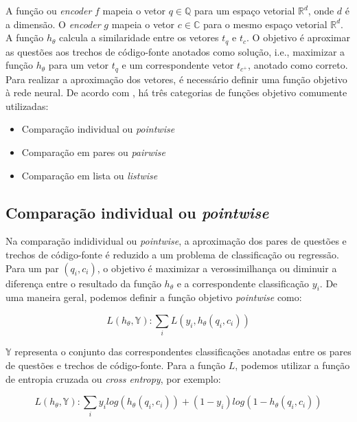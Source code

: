 A função ou \textit{encoder} $f$ mapeia o vetor $q \in \mathbb{Q}$ para um espaço vetorial $\mathbb{R}^{d}$, onde $d$ é a dimensão. O \textit{encoder} $g$ mapeia o vetor $c \in \mathbb{C}$ para o mesmo espaço vetorial $\mathbb{R}^{d}$. A função $h_{\theta}$ calcula a similaridade entre os vetores $t_{q}$ e $t_{c}$. O objetivo é aproximar as questões aos trechos de código-fonte anotados como solução, i.e., maximizar a função $h_{\theta}$ para um vetor $t_{q}$ e um correspondente vetor $t_{c^{+}}$, anotado como correto. Para realizar a aproximação dos vetores, é necessário definir uma função objetivo à rede neural. De acordo com \cite{guo-deep-look-into-neural-ranking-models:2019}, há três categorias de funções objetivo comumente utilizadas:

\begin{itemize}
    \item Comparação individual ou \textit{pointwise}
    \item Comparação em pares ou \textit{pairwise}
    \item Comparação em lista ou \textit{listwise}
\end{itemize}


\subsection{Comparação individual ou \textit{pointwise}}

Na comparação indidividual ou \textit{pointwise}, a aproximação dos pares de questões e trechos de código-fonte é reduzido a um problema de classificação ou regressão. Para um par $(q_{i}, c_{i})$, o objetivo é maximizar a verossimilhança ou diminuir a diferença entre o resultado da função $h_{\theta}$ e a correspondente classificação $y_{i}$. De uma maneira geral, podemos definir a função objetivo \textit{pointwise} como:

\begin{equation}
    L (h_{\theta}, \mathbb{Y}): \sum_{i} L(y_{i}, h_{\theta}(q_{i}, c_{i})) 
\end{equation}

$\mathbb{Y}$ representa o conjunto das correspondentes classificações anotadas entre os pares de questões e trechos de código-fonte. Para a função $L$, podemos utilizar a função de entropia cruzada ou \textit{cross entropy}, por exemplo:

\begin{equation}
    L (h_{\theta}, \mathbb{Y}): \sum_{i} y_{i} log( h_{\theta}(q_{i}, c_{i})) + (1 - y_{i})log(1 - h_{\theta}(q_{i}, c_{i})) 
\end{equation}

